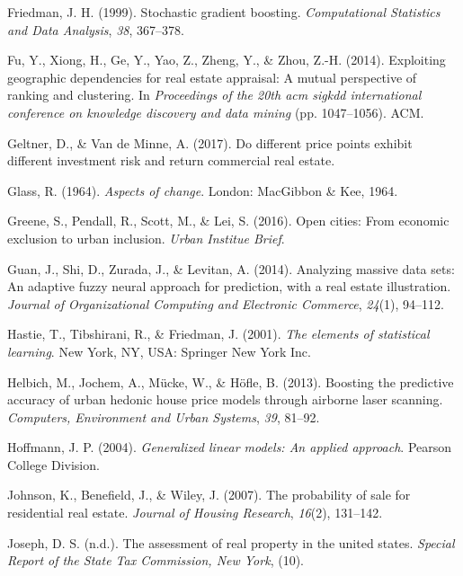 \documentclass[conference,final,]{IEEEtran}
\begin{document}
\leavevmode\hypertarget{ref-Friedman99stochasticgradient}{}%
Friedman, J. H. (1999). Stochastic gradient boosting.
\emph{Computational Statistics and Data Analysis}, \emph{38}, 367--378.

\leavevmode\hypertarget{ref-Fu2014}{}%
Fu, Y., Xiong, H., Ge, Y., Yao, Z., Zheng, Y., \& Zhou, Z.-H. (2014).
Exploiting geographic dependencies for real estate appraisal: A mutual
perspective of ranking and clustering. In \emph{Proceedings of the 20th
acm sigkdd international conference on knowledge discovery and data
mining} (pp. 1047--1056). ACM.

\leavevmode\hypertarget{ref-Geltner2017}{}%
Geltner, D., \& Van de Minne, A. (2017). Do different price points
exhibit different investment risk and return commercial real estate.

\leavevmode\hypertarget{ref-glass1964}{}%
Glass, R. (1964). \emph{Aspects of change}. London: MacGibbon \& Kee,
1964.

\leavevmode\hypertarget{ref-urban2016}{}%
Greene, S., Pendall, R., Scott, M., \& Lei, S. (2016). Open cities: From
economic exclusion to urban inclusion. \emph{Urban Institue Brief}.

\leavevmode\hypertarget{ref-Guan2014}{}%
Guan, J., Shi, D., Zurada, J., \& Levitan, A. (2014). Analyzing massive
data sets: An adaptive fuzzy neural approach for prediction, with a real
estate illustration. \emph{Journal of Organizational Computing and
Electronic Commerce}, \emph{24}(1), 94--112.

\leavevmode\hypertarget{ref-hastie01statisticallearning}{}%
Hastie, T., Tibshirani, R., \& Friedman, J. (2001). \emph{The elements
of statistical learning}. New York, NY, USA: Springer New York Inc.

\leavevmode\hypertarget{ref-Helbich2013}{}%
Helbich, M., Jochem, A., Mücke, W., \& Höfle, B. (2013). Boosting the
predictive accuracy of urban hedonic house price models through airborne
laser scanning. \emph{Computers, Environment and Urban Systems},
\emph{39}, 81--92.

\leavevmode\hypertarget{ref-hoffmann2004generalized}{}%
Hoffmann, J. P. (2004). \emph{Generalized linear models: An applied
approach}. Pearson College Division.

\leavevmode\hypertarget{ref-Johnson2007}{}%
Johnson, K., Benefield, J., \& Wiley, J. (2007). The probability of sale
for residential real estate. \emph{Journal of Housing Research},
\emph{16}(2), 131--142.

\leavevmode\hypertarget{ref-Silverherz1936}{}%
Joseph, D. S. (n.d.). The assessment of real property in the united
states. \emph{Special Report of the State Tax Commission, New York},
(10).
\end{document}
